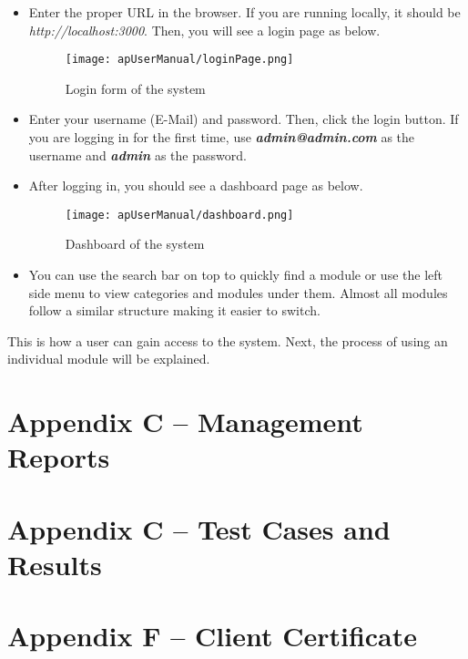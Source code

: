 \documentclass[12pt]{report}
\begin{document}
\begin{itemize}
	\item Enter the proper URL in the browser. If you are running locally, it should be {\it{http://localhost:3000}}. Then, you will see a login page as below.

	      \begin{figure}[H]
		      \centering
		      \texttt{[image: apUserManual/loginPage.png]}
		      \caption{Login form of the system}
	      \end{figure}

	\item Enter your username (E-Mail) and password. Then, click the login button. If you are logging in for the first time, use {\it\bf{admin@admin.com}} as the username and {\it\bf{admin}} as the password.
	\item After logging in, you should see a dashboard page as below.

	      \begin{figure}[H]
		      \centering
		      \texttt{[image: apUserManual/dashboard.png]}
		      \caption{Dashboard of the system}
	      \end{figure}

	\item You can use the search bar on top to quickly find a module or use the left side menu to view categories and modules under them. Almost all modules follow a similar structure making it easier to switch.
\end{itemize}

This is how a user can gain access to the system. Next, the process of using an individual module will be explained.

\setcounter{chapter}{4}
\setcounter{section}{0}
\setcounter{figure}{0}
\chapter*{\Huge Appendix C – Management Reports}

\setcounter{chapter}{5}
\setcounter{section}{0}
\setcounter{figure}{0}
\chapter*{\Huge Appendix C – Test Cases and Results}

\chapter*{\Huge Appendix F – Client Certificate}
\end{document}
